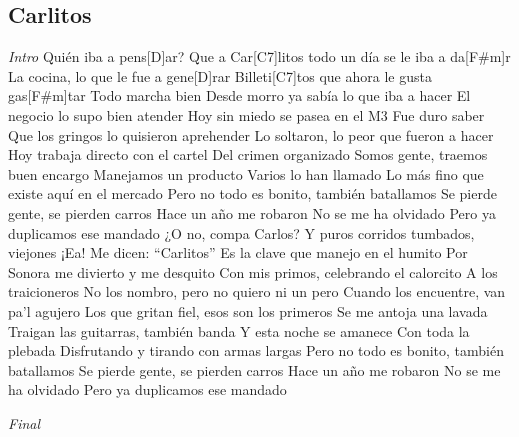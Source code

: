 \subsection{Carlitos}
\noindent
\vspace{1cm}

\begin{guitar}
	\begin{multicols}{2}
		\textit{Intro}
		Quién iba a pens[D]ar?
		Que a Car[C7]litos todo un día se le iba a da[F#m]r
		La cocina, lo que le fue a gene[D]rar
		Billeti[C7]tos que ahora le gusta gas[F#m]tar
	Todo marcha bien
	Desde morro ya sabía lo que iba a hacer
	El negocio lo supo bien atender
	Hoy sin miedo se pasea en el M3
	Fue duro saber
	Que los gringos lo quisieron aprehender
	Lo soltaron, lo peor que fueron a hacer
	Hoy trabaja directo con el cartel
	Del crimen organizado
	Somos gente, traemos buen encargo
	Manejamos un producto
	Varios lo han llamado
	Lo más fino que existe aquí en el mercado
	Pero no todo es bonito, también batallamos
	Se pierde gente, se pierden carros
	Hace un año me robaron
	No se me ha olvidado
	Pero ya duplicamos ese mandado
	¿O no, compa Carlos?
	Y puros corridos tumbados, viejones
	¡Ea!
	Me dicen: ``Carlitos''
	Es la clave que manejo en el humito
	Por Sonora me divierto y me desquito
	Con mis primos, celebrando el calorcito
	A los traicioneros
	No los nombro, pero no quiero ni un pero
	Cuando los encuentre, van pa'l agujero
	Los que gritan fiel, esos son los primeros
	Se me antoja una lavada
	Traigan las guitarras, también banda
	Y esta noche se amanece
	Con toda la plebada
	Disfrutando y tirando con armas largas
	Pero no todo es bonito, también batallamos
	Se pierde gente, se pierden carros
	Hace un año me robaron
	No se me ha olvidado
	Pero ya duplicamos ese mandado
		\par
		\textit{Final}
	\end{multicols}
\end{guitar}
